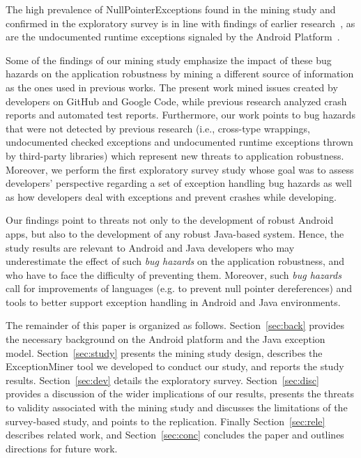  The high prevalence of NullPointerExceptions found in the mining study and confirmed in the exploratory survey
 is in line with findings of earlier research~\cite{kim2013predicting,fraser20131600,csallner2004jcrasher}, 
as are the undocumented runtime exceptions signaled by the Android Platform~\cite{kechagia2014}. 

Some of the findings of our mining study emphasize the impact of these bug hazards on the application robustness 
by mining a different source of information as the ones used in previous works. The present work 
mined issues created by developers on GitHub and Google Code, while  previous research analyzed crash reports and automated test reports.
 Furthermore, our work points to bug hazards that were not detected by previous research (i.e., cross-type wrappings, undocumented checked exceptions and undocumented runtime exceptions thrown by third-party libraries) which represent new threats to application robustness.
Moreover, we perform  the first exploratory survey study whose
goal was to assess developers' perspective regarding a set of exception handling bug hazards
as well as how developers deal with exceptions and prevent crashes while developing.

Our findings point to threats not only to the development of robust Android apps, 
but also to the development of any robust Java-based system. 
Hence, the study results are relevant to Android and Java developers who may underestimate the effect of such
 \emph{bug hazards} on the application robustness,
and who have to face the difficulty of preventing them.
Moreover, such \emph{bug hazards} 
call for improvements of languages (e.g. to prevent null pointer dereferences) and tools
 to better support exception handling in Android and Java environments.


The remainder of this paper is organized as follows. 
Section~\ref{sec:back} provides the necessary
background on the Android platform and the Java exception model. 
Section~\ref{sec:study} presents the mining study design, describes the ExceptionMiner tool 
we developed to conduct our study, and reports the study results.
Section~\ref{sec:dev} details the exploratory survey.
Section~\ref{sec:disc} provides a discussion of the wider implications of our results,
 presents the threats to validity associated with the mining study and discusses the limitations
of the survey-based study, and points to the replication. 
Finally Section~\ref{sec:rele} describes related work, 
and Section~\ref{sec:conc} concludes the paper and outlines
directions for future work.
